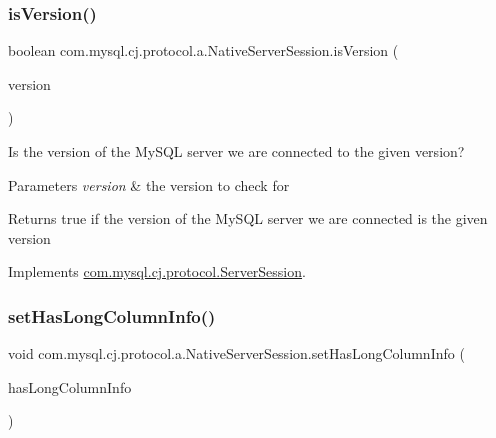 \subsubsection{\texorpdfstring{is\+Version()}{isVersion()}}
{\footnotesize\ttfamily boolean com.\+mysql.\+cj.\+protocol.\+a.\+Native\+Server\+Session.\+is\+Version (\begin{DoxyParamCaption}\item[{\mbox{\hyperlink{classcom_1_1mysql_1_1cj_1_1_server_version}{Server\+Version}}}]{version }\end{DoxyParamCaption})}

Is the version of the My\+S\+QL server we are connected to the given version?


\begin{DoxyParams}{Parameters}
{\em version} & the version to check for\\
\hline
\end{DoxyParams}
\begin{DoxyReturn}{Returns}
true if the version of the My\+S\+QL server we are connected is the given version 
\end{DoxyReturn}


Implements \mbox{\hyperlink{interfacecom_1_1mysql_1_1cj_1_1protocol_1_1_server_session_a021c8f114fce23443b9a8b26074b137a}{com.\+mysql.\+cj.\+protocol.\+Server\+Session}}.

\mbox{\label{classcom_1_1mysql_1_1cj_1_1protocol_1_1a_1_1_native_server_session_ab7e6639fd06a4d47ab35e3cd89dfc10a}} 
\subsubsection{\texorpdfstring{set\+Has\+Long\+Column\+Info()}{setHasLongColumnInfo()}}
{\footnotesize\ttfamily void com.\+mysql.\+cj.\+protocol.\+a.\+Native\+Server\+Session.\+set\+Has\+Long\+Column\+Info (\begin{DoxyParamCaption}\item[{boolean}]{has\+Long\+Column\+Info }\end{DoxyParamCaption})}

